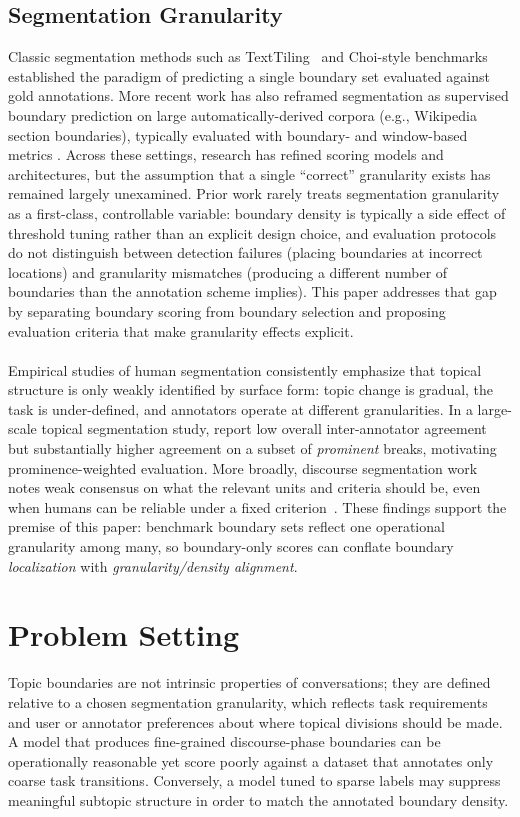 \documentclass{article}
\makeatletter
\newcommand{\myparagraph}[1]{%
  \paragraph{\@addpunct{#1}}%
}
\makeatother
\begin{document}
\subsection{Segmentation Granularity}
Classic segmentation methods such as TextTiling~\cite{hearst1997texttiling} and
Choi-style benchmarks~\cite{choi2000advances} established the paradigm of
predicting a single boundary set evaluated against gold annotations. More
recent work has also reframed segmentation as supervised boundary prediction on
large automatically-derived corpora (e.g., Wikipedia section boundaries),
typically evaluated with boundary- and window-based metrics
\citep{koshorek2018text}. Across these settings, research has refined scoring
models and architectures, but the assumption that a single ``correct''
granularity exists has remained largely unexamined. Prior work rarely treats
segmentation granularity as a first-class, controllable variable: boundary
density is typically a side effect of threshold tuning rather than an explicit
design choice, and evaluation protocols do not distinguish between detection
failures (placing boundaries at incorrect locations) and granularity mismatches
(producing a different number of boundaries than the annotation scheme implies).
This paper addresses that gap by separating boundary scoring from boundary
selection and proposing evaluation criteria that make granularity effects
explicit.

\myparagraph{Multiple valid granularities and weakly-identified boundaries}
Empirical studies of human segmentation consistently emphasize that topical
structure is only weakly identified by surface form: topic change is gradual,
the task is under-defined, and annotators operate at different granularities.
In a large-scale topical segmentation study, \citet{kazantseva-szpakowicz-2012-topical}
report low overall inter-annotator agreement but substantially higher agreement
on a subset of \emph{prominent} breaks, motivating prominence-weighted
evaluation. More broadly, discourse segmentation work notes weak consensus on
what the relevant units and criteria should be, even when humans can be
reliable under a fixed criterion~\citep{passonneau-litman-1997-discourse}. These
findings support the premise of this paper: benchmark boundary sets reflect one
operational granularity among many, so boundary-only scores can conflate
boundary \emph{localization} with \emph{granularity/density alignment}.

\section{Problem Setting}
\label{sec:problem-setting}
Topic boundaries are not intrinsic properties of conversations; they
are defined relative to a chosen segmentation granularity, which
reflects task requirements and user or annotator preferences about
where topical divisions should be made. A model that produces
fine-grained discourse-phase boundaries can be operationally
reasonable yet score poorly against a dataset that annotates only
coarse task transitions. Conversely, a model tuned to sparse labels
may suppress meaningful subtopic structure in order to match the
annotated boundary density.
\end{document}
